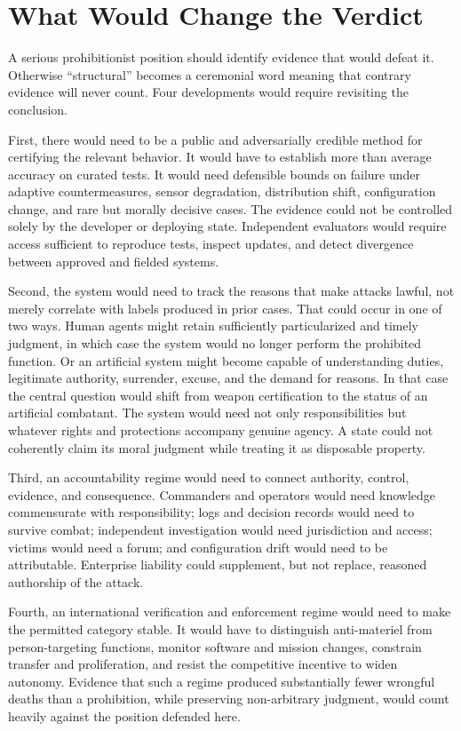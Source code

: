 \documentclass[11pt]{article}
\begin{document}
\section{What Would Change the Verdict}
\label{sec:change}

A serious prohibitionist position should identify evidence that would defeat it. Otherwise ``structural'' becomes a ceremonial word meaning that contrary evidence will never count. Four developments would require revisiting the conclusion.

First, there would need to be a public and adversarially credible method for certifying the relevant behavior. It would have to establish more than average accuracy on curated tests. It would need defensible bounds on failure under adaptive countermeasures, sensor degradation, distribution shift, configuration change, and rare but morally decisive cases. The evidence could not be controlled solely by the developer or deploying state. Independent evaluators would require access sufficient to reproduce tests, inspect updates, and detect divergence between approved and fielded systems.

Second, the system would need to track the reasons that make attacks lawful, not merely correlate with labels produced in prior cases. That could occur in one of two ways. Human agents might retain sufficiently particularized and timely judgment, in which case the system would no longer perform the prohibited function. Or an artificial system might become capable of understanding duties, legitimate authority, surrender, excuse, and the demand for reasons. In that case the central question would shift from weapon certification to the status of an artificial combatant. The system would need not only responsibilities but whatever rights and protections accompany genuine agency. A state could not coherently claim its moral judgment while treating it as disposable property.

Third, an accountability regime would need to connect authority, control, evidence, and consequence. Commanders and operators would need knowledge commensurate with responsibility; logs and decision records would need to survive combat; independent investigation would need jurisdiction and access; victims would need a forum; and configuration drift would need to be attributable. Enterprise liability could supplement, but not replace, reasoned authorship of the attack.

Fourth, an international verification and enforcement regime would need to make the permitted category stable. It would have to distinguish anti-materiel from person-targeting functions, monitor software and mission changes, constrain transfer and proliferation, and resist the competitive incentive to widen autonomy. Evidence that such a regime produced substantially fewer wrongful deaths than a prohibition, while preserving non-arbitrary judgment, would count heavily against the position defended here.
\end{document}
